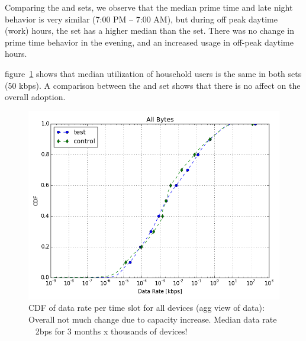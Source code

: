 Comparing the \test and \control sets, we observe that the median prime time and late night
behavior is very similar (7:00 PM -- 7:00 AM), but during off peak daytime (work) hours,
the \test set has a higher median than the \control set. There was no change in
prime time behavior in the evening, and an increased usage in off-peak daytime hours.


figure~\ref{fig:CDF-data-rate-all} shows that
median utilization of household users is the same in both sets (50 kbps). A 
comparison
between the \test and \control set shows that there is no affect on the overall 
adoption.

\begin{figure}[ht]
\centering
\includegraphics[width=0.90\linewidth]{figures/cdf-all-bytes.png}
  \caption{CDF of data rate per time slot for all devices (agg view of data): 
Overall not much change due to capacity increase. Median data rate ~ 2bps for 3 
months x thousands of devices!}
  \label{fig:CDF-data-rate-all}
\end{figure}

